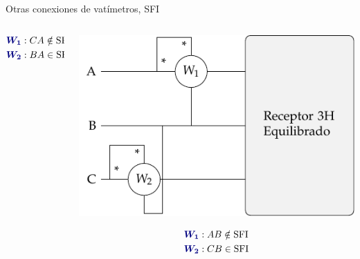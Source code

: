 \documentclass[aspectratio=169, usenames,svgnames,dvipsnames]{beamer}
\begin{document}
\begin{frame}{Otras conexiones de vatímetros, \hspace{3mm}SFI}
\begin{columns}
\begin{column}{0.33\columnwidth}
        \vspace{-8mm}
        \begin{align*}
          {\boldsymbol{\color{blue!50!black} W_1}}&: CA \notin \text{SFI}\\
          {\boldsymbol{\color{blue!50!black} W_2}}&: BA \in \text{SFI}\\
        \end{align*}
    \end{column}
    \begin{column}{0.33\columnwidth}
        \begin{center}
            \includegraphics[width=1\linewidth]{../figs/Potencia3H_Equilibrado_CA_SFI.pdf}
        \end{center}
        
        \vspace{-8mm}
        \begin{align*}
          {\boldsymbol{\color{blue!50!black} W_1}}&: AB \notin \text{SFI}\\
          {\boldsymbol{\color{blue!50!black} W_2}}&: CB \in \text{SFI}\\
        \end{align*}
    \end{column}
    \end{columns}
\end{frame}

\end{document}
